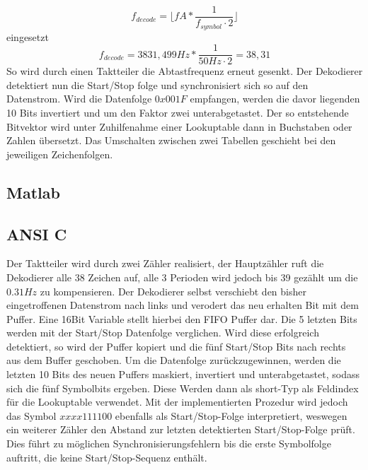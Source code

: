 \documentclass{article}
\begin{document}
$$
f_{decode} = \lfloor fA * \frac{1}{f_{symbol} \cdot 2}\rfloor 
$$
eingesetzt
$$
f_{decode} = 3831,499Hz * \frac{1}{50Hz\cdot 2} = 38,31
$$
So wird durch einen Taktteiler die Abtastfrequenz erneut gesenkt. Der Dekodierer detektiert nun die Start/Stop folge und synchronisiert sich so auf den Datenstrom. Wird die Datenfolge $0x001F$ empfangen, werden die davor liegenden 10 Bits invertiert und um den Faktor zwei unterabgetastet. Der so entstehende Bitvektor wird unter Zuhilfenahme einer Lookuptable dann in Buchstaben oder Zahlen übersetzt. Das Umschalten zwischen zwei Tabellen geschieht bei den jeweiligen Zeichenfolgen.

\subsection{Matlab}

\subsection{ANSI C} 
Der Taktteiler wird durch zwei Zähler realisiert, der Hauptzähler ruft die Dekodierer alle 38 Zeichen auf, alle 3 Perioden wird jedoch bis 39 gezählt um die $0.31Hz$ zu kompensieren. Der Dekodierer selbst verschiebt den bisher eingetroffenen Datenstrom nach links und verodert das neu erhalten Bit mit dem Puffer. Eine 16Bit Variable stellt hierbei den FIFO Puffer dar. Die 5 letzten Bits werden mit der Start/Stop Datenfolge verglichen. Wird diese erfolgreich detektiert, so wird der Puffer kopiert und die fünf Start/Stop Bits nach rechts aus dem Buffer geschoben. Um die Datenfolge zurückzugewinnen, werden die letzten 10 Bits des neuen Puffers maskiert, invertiert und unterabgetastet, sodass sich die fünf Symbolbits ergeben.
Diese Werden dann als short-Typ als Feldindex für die Lookuptable verwendet.
Mit der implementierten Prozedur wird jedoch das Symbol $xxxx111100$ ebenfalls als Start/Stop-Folge interpretiert, weswegen ein weiterer Zähler den Abstand zur letzten detektierten Start/Stop-Folge prüft. Dies führt zu möglichen Synchronisierungsfehlern bis die erste Symbolfolge auftritt, die keine Start/Stop-Sequenz enthält. 
\end{document}
